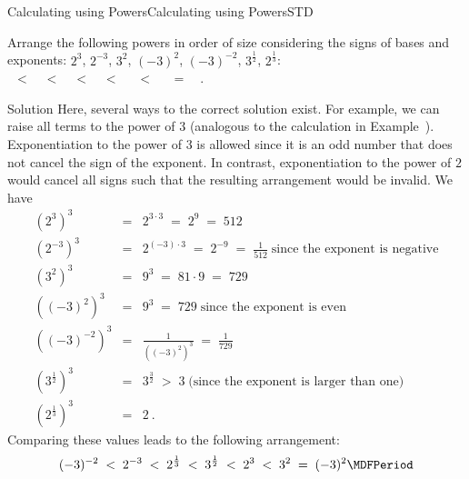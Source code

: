 \begin{MXContent}{Calculating using Powers}{Calculating using Powers}{STD}
\begin{MExercise}
Arrange the following powers in order of size considering the signs of bases and exponents: 
$2^3$, $2^{-3}$, $3^2$, $(-3)^2$, $(-3)^{-2}$, $3^{\frac12}$, $2^{\frac13}$:
\ \\
\ $<$\ 
\ $<$\ 
\ $<$\ 
\ $<$\ 
 \ $<$\ 
 \ $=$\ 
\ .
\ \\
\begin{MHint}{Solution}
Here, several ways to the correct solution exist. For example, we can raise all terms to the 
power of $3$ (analogous to the calculation in Example~). Exponentiation to
the power of $3$ is allowed since it is an odd number that does not cancel the sign of the exponent.
In contrast, exponentiation to the power of $2$ would cancel all signs such that the resulting 
arrangement would be invalid. We have
\begin{eqnarray*}
(2^3)^3 &=& 2^{3\cdot 3} \;=\; 2^9 \;=\; 512\\
(2^{-3})^3 &=& 2^{(-3)\cdot 3}\;=\; 2^{-9} \;=\; \frac1{512}\;\text{since the exponent is negative}\\
(3^2)^3 &=& 9^3 \;=\; 81\cdot9 \;=\; 729\\
((-3)^2)^3 &=& 9^3 \;=\; 729\;\text{since the exponent is even}\\
((-3)^{-2})^3 &=& \frac1{((-3)^2)^3} \;=\; \frac1{729}\\
(3^{\frac12})^3 &=& 3^{\frac32}\; >\; 3 \;\text{(since the exponent is larger than one)}\\
(2^{\frac13})^3 &=& 2\: .
\end{eqnarray*}
Comparing these values leads to the following arrangement:
$$
(-3)^{-2}\;<\;2^{-3}\;<\;2^{\frac13}\;<\;3^{\frac12}\; < \; 2^3\; < \; 3^2 \;=\; (-3)^2\MDFPeriod
$$
\end{MHint}
\end{MExercise}

\end{MXContent}

